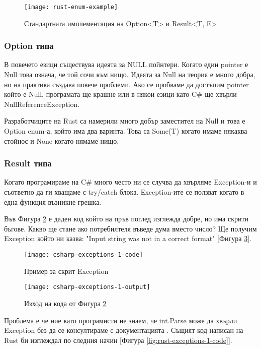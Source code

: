 \begin{figure}[!htb]
  \texttt{[image: rust-enum-example]}
  \centering
  \caption{Стандартната имплементация на Option<T> и Result<T, E>}
  \label{fig:rust-enum-example}
\end{figure}

\newpage

\subsubsection{Option типа}
В повечето езици съществува идеята за NULL пойнтери. Когато един pointer е Null
това означа, че той сочи към нищо. Идеята за Null на теория е много добра, но
на практика създава повече проблеми. Ако се пробваме да достъпим pointer който
е Null, програмата ще крашне или в някои езици като C\# ще хвърли
NullReferenceException.

Разработчиците на Rust са намерили много добър заместител на Null и това е
Option enum-а, който има два варинта. Това са Some(T) когато имаме някаква
стойнос и None когато нямаме нищо.

\subsubsection{Result типа}
Когато програмираме на C\# много често ни се случва да хвърляме Exception-и и
съответно да ги хващаме с try/catch блока. Еxception-ите се ползват когато в
една функция възникне грешка.

Във Фигура \ref{fig:csharp-exceptions-1-code} е даден код който на пръв поглед
изглежда добре, но има скрити бъгове. Какво ще стане ако потребилтеля въведе
дума вместо число? Ще получим Exception който ни казва: "Input string was not
in a correct format" [Фигура \ref{fig:csharp-exceptions-1-output}].

\begin{figure}[!htb]
  \texttt{[image: csharp-exceptions-1-code]}
  \centering
  \caption{Пример за скрит Exception}
  \label{fig:csharp-exceptions-1-code}
\end{figure}

\begin{figure}[!htb]
  \texttt{[image: csharp-exceptions-1-output]}
  \centering
  \caption{Изход на кода от Фигура \ref{fig:csharp-exceptions-1-code}}
  \label{fig:csharp-exceptions-1-output}
\end{figure}

Проблема е че ние като програмисти не знаем, че int.Parse може да хвърли
Exception без да се консултираме с документацията \cite{CSharp_Int_Parse}.
Същият код написан на Rust би изглеждал по следния начин [Фигура \ref{fig:rust-exceptions-1-code}].

